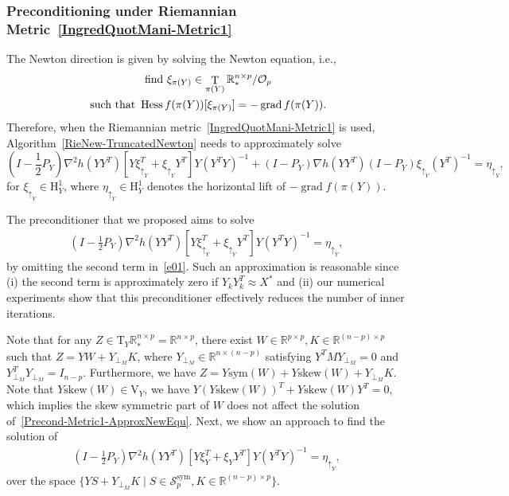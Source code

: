 \documentclass[11pt]{article}
\numberwithin{equation}{section}
\DeclareMathOperator{\T}{\mathrm{T}}
\DeclareMathOperator{\Hess}{\mathrm{Hess}}
\DeclareMathOperator{\grad}{\mathrm{grad}}
\begin{document}
\subsubsection{Preconditioning under Riemannian Metric~\eqref{IngredQuotMani-Metric1}} \label{sec:PreCon01}

The Newton direction is given by solving the Newton equation, i.e.,
\begin{gather*}
\hbox{ find } \xi_{\pi(Y)} \in \T_{\pi(Y)} \mathbb{R}_*^{n \times p} / \mathcal{O}_p \\
\hbox{ such that } \Hess f( \pi(Y) ) [\xi_{\pi(Y)}] = - \grad f(\pi(Y)).
\end{gather*}
Therefore, when the Riemannian metric~\eqref{IngredQuotMani-Metric1} is used, Algorithm~\ref{RieNew-TruncatedNewton} needs to approximately solve 
\begin{equation} \label{e01}
  \left( I-\frac{1}{2}P_Y\right)\nabla^2h(YY^T)[Y\xi_{\uparrow_Y}^T+\xi_{\uparrow_Y}Y^T]Y(Y^TY)^{-1} + (I-P_Y)\nabla h(YY^T)(I-P_Y)\xi_{\uparrow_Y}(Y^T)^{-1} =\eta_{\uparrow_Y},
\end{equation}
for $\xi_{\uparrow_Y}\in\mathrm{H}_Y^1$, where $\eta_{\uparrow_Y}\in \mathrm{H}_Y^1$ denotes the horizontal lift of $-\grad f(\pi(Y))$.

The preconditioner that we proposed aims to solve
\begin{align} \label{Precond-Metric1-ApproxNewEqu}
  \left( I - \frac{1}{2}P_Y \right)\nabla^2h(YY^T)[Y\xi_{\uparrow_Y}^T+\xi_{\uparrow_Y}Y^T]Y(Y^TY)^{-1}=\eta_{\uparrow_Y},
\end{align}
by omitting the second term in~\eqref{e01}. Such an approximation is reasonable since (i) the second term is approximately zero if $Y_k Y_k^T \approx X^*$ and (ii) our numerical experiments show that this preconditioner effectively reduces the number of inner iterations.

Note that for any $Z \in \mathrm{T}_Y\mathbb{R}_*^{n \times p}=\mathbb{R}^{n\times p}$, there exist $W \in \mathbb{R}^{p \times p}, K \in \mathbb{R}^{(n - p) \times p}$ such that $Z = YW + Y_{\perp_M} K$, where $Y_{\perp_M} \in \mathbb{R}^{n \times (n - p)}$ satisfying $Y^T M Y_{\perp_M} = 0$ and $Y_{\perp_M}^T Y_{\perp_M} = I_{n - p}$. Furthermore, we have $Z = Y \mathrm{sym}(W) + Y \mathrm{skew}(W) + Y_{\perp_M} K$. Note that $Y \mathrm{skew}(W) \in \mathrm{V}_Y$, we have $Y (Y \mathrm{skew}(W))^T + Y \mathrm{skew}(W) Y^T = 0$, which implies the skew symmetric part of $W$ does not affect the solution of~\eqref{Precond-Metric1-ApproxNewEqu}. Next, we show an approach to find the solution of
\begin{align} \label{e03}
  \left( I - \frac{1}{2}P_Y \right)\nabla^2h(YY^T)[Y\xi_{Y}^T+\xi_{Y}Y^T]Y(Y^TY)^{-1}=\eta_{\uparrow_Y},
\end{align}
over the space $\{Y S + Y_{\perp_M} K \mid S \in\mathcal{S}_p^{\mathrm{sym}}, K \in \mathbb{R}^{(n - p) \times p}  \}$.
\end{document}
